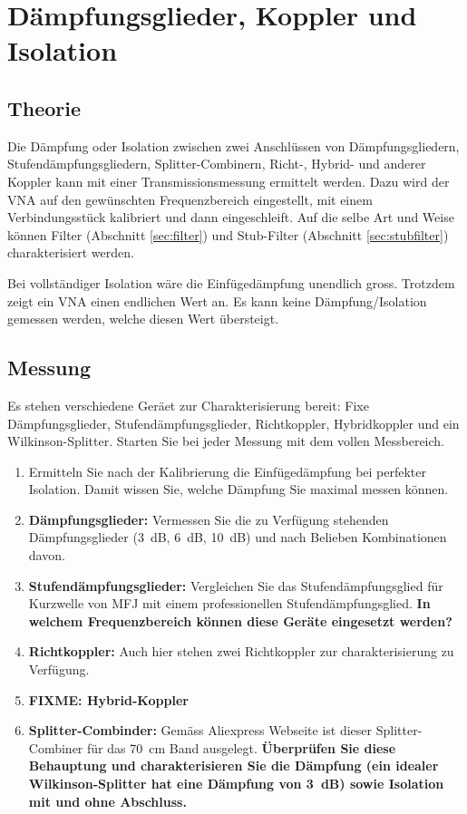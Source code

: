 \documentclass[twoside,a4paper,11pt,halfparskip,DIV=11,notitlepage]{scrartcl}
\begin{document}
\section{Dämpfungsglieder, Koppler und Isolation}
\subsection{Theorie}
Die Dämpfung oder Isolation zwischen zwei Anschlüssen von Dämpfungsgliedern,
Stufendämpfungsgliedern, Splitter-Combinern, Richt-, Hybrid- und anderer Koppler
kann mit einer Transmissionsmessung ermittelt werden. Dazu wird der VNA auf den
gewünschten Frequenzbereich eingestellt, mit einem Verbindungsstück kalibriert
und dann eingeschleift. Auf die selbe Art und Weise können Filter (Abschnitt 
\ref{sec:filter}) und Stub-Filter (Abschnitt \ref{sec:stubfilter}) charakterisiert
werden.

Bei vollständiger Isolation wäre die Einfügedämpfung unendlich gross. Trotzdem
zeigt ein VNA einen endlichen Wert an. Es kann keine Dämpfung/Isolation gemessen
werden, welche diesen Wert übersteigt.

\subsection{Messung}
Es stehen verschiedene Geräet zur Charakterisierung bereit: Fixe Dämpfungsglieder,
Stufendämpfungsglieder, Richtkoppler, Hybridkoppler und ein Wilkinson-Splitter.
Starten Sie bei jeder Messung mit dem vollen Messbereich.

\begin{enumerate}
    \item Ermitteln Sie nach der Kalibrierung die Einfügedämpfung bei
        perfekter Isolation. Damit wissen Sie, welche Dämpfung Sie maximal
        messen können.
    \item \textbf{Dämpfungsglieder:} Vermessen Sie die zu Verfügung stehenden
        Dämpfungsglieder (3~dB, 6~dB, 10~dB) und nach Belieben Kombinationen davon.
    \item \textbf{Stufendämpfungsglieder:} Vergleichen Sie das Stufendämpfungsglied
        für Kurzwelle von MFJ mit einem professionellen Stufendämpfungsglied.
        \textbf{In welchem Frequenzbereich können diese Geräte eingesetzt werden?}
    \item \textbf{Richtkoppler:} Auch hier stehen zwei Richtkoppler zur charakterisierung
        zu Verfügung. %
    \item \textbf{FIXME: Hybrid-Koppler}
    \item \textbf{Splitter-Combinder:} Gemäss Aliexpress Webseite ist dieser
        Splitter-Combiner für das 70~cm Band ausgelegt. \textbf{Überprüfen Sie
            diese Behauptung und charakterisieren Sie die Dämpfung (ein idealer
            Wilkinson-Splitter hat eine Dämpfung von 3~dB) sowie Isolation mit
            und ohne Abschluss.}
\end{enumerate}
\end{document}
